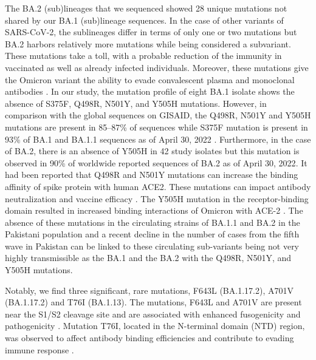 The BA.2 (sub)lineages that we sequenced showed 28 unique mutations not shared by our BA.1 (sub)lineage sequences.
In the case of other variants of SARS-CoV-2, the sublineages differ in terms of only one or two mutations but BA.2 harbors relatively more mutations while being considered a subvariant.
These mutations take a toll, with a probable reduction of the immunity in vaccinated as well as already infected individuals.
Moreover, these mutations give the Omicron variant the ability to evade convalescent plasma and monoclonal antibodies \cite{ai2022antibody, altarawneh2022effect}.
In our study, the mutation profile of eight BA.1 isolate shows the absence of S375F, Q498R, N501Y, and Y505H mutations.
However, in comparison with the global sequences on GISAID, the Q498R, N501Y and Y505H mutations are present in 85--87\% of sequences while S375F mutation is present in 93\% of BA.1 and BA.1.1 sequences as of April 30, 2022 \cite{shu2017gisaid}.
Furthermore, in the case of BA.2, there is an absence of Y505H in 42 study isolates but this mutation is observed in 90\% of worldwide reported sequences of BA.2 as of April 30, 2022\cite{shu2017gisaid}.
It had been reported that Q498R and N501Y mutations can increase the binding affinity of spike protein with human ACE2.
These mutations can impact antibody neutralization and vaccine efficacy \cite{schubert2022human}.
The Y505H mutation in the receptor-binding domain resulted in increased binding interactions of Omicron with ACE-2 \cite{ortega2021Omicron}.
The absence of these mutations in the circulating strains of BA.1.1 and BA.2 in the Pakistani population and a recent decline in the number of cases from the fifth wave in Pakistan can be linked to these circulating sub-variants being not
very highly transmissible as the BA.1 and the BA.2 with the Q498R, N501Y, and Y505H mutations.

Notably, we find three significant, rare mutations, F643L (BA.1.17.2), A701V (BA.1.17.2) and T76I (BA.1.13).
The mutations, F643L and A701V are present near the S1/S2 cleavage site and are associated with enhanced fusogenicity and pathogenicity \cite{saito2022enhanced}.
Mutation T76I, located in the N-terminal domain (NTD) region, was observed to affect antibody binding efficiencies and contribute to evading immune response \cite{ou2022tracking}.

